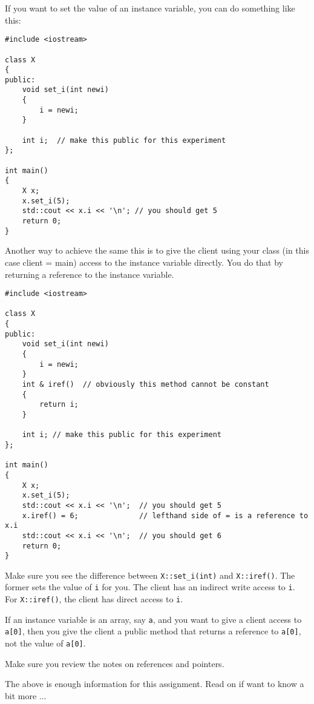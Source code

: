 If you want to set the value of an instance variable, you can do something like this:
\begin{Verbatim}[frame=single]
#include <iostream>

class X
{
public:
    void set_i(int newi)
    {
        i = newi;
    }

    int i;  // make this public for this experiment
};

int main()
{
    X x;
    x.set_i(5);
    std::cout << x.i << '\n'; // you should get 5
    return 0;
}
\end{Verbatim}
Another way to achieve the same this is to give the client using your class (in this case client = main)
access to the instance variable directly. You do that by returning a reference to the instance variable.
\begin{Verbatim}[frame=single]
#include <iostream>

class X
{
public:
    void set_i(int newi)
    {
        i = newi;
    }
    int & iref()  // obviously this method cannot be constant
    {
        return i;
    }

    int i; // make this public for this experiment
};

int main()
{
    X x;
    x.set_i(5);
    std::cout << x.i << '\n';  // you should get 5
    x.iref() = 6;              // lefthand side of = is a reference to x.i
    std::cout << x.i << '\n';  // you should get 6
    return 0;
}
\end{Verbatim}
Make sure you see the difference between \verb!X::set_i(int)! and \verb!X::iref()!. The former sets the value of \verb!i! for
you. The client has an indirect write access to \verb!i!. For \verb!X::iref()!, the client has direct access to \verb!i!.

If an instance variable is an array, say \verb!a!, and you want to give a client access to \verb!a[0]!, then you give the
client a public method that returns a reference to \verb!a[0]!, not the value of \verb!a[0]!.

Make sure you review the notes on references and pointers.

The above is enough information for this assignment. Read on if want to know a bit more ...

